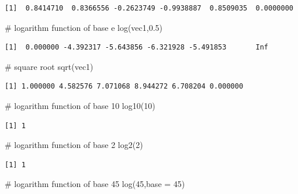 \documentclass[
  letterpaper,
  DIV=11,
  numbers=noendperiod]{scrreprt}
\newenvironment{Shaded}{\begin{snugshade}}{\end{snugshade}}
\newcommand{\AttributeTok}[1]{\textcolor[rgb]{0.40,0.45,0.13}{#1}}
\newcommand{\CommentTok}[1]{\textcolor[rgb]{0.37,0.37,0.37}{#1}}
\newcommand{\DecValTok}[1]{\textcolor[rgb]{0.68,0.00,0.00}{#1}}
\newcommand{\FloatTok}[1]{\textcolor[rgb]{0.68,0.00,0.00}{#1}}
\newcommand{\FunctionTok}[1]{\textcolor[rgb]{0.28,0.35,0.67}{#1}}
\newcommand{\NormalTok}[1]{\textcolor[rgb]{0.00,0.23,0.31}{#1}}
\begin{document}
\begin{verbatim}
[1]  0.8414710  0.8366556 -0.2623749 -0.9938887  0.8509035  0.0000000
\end{verbatim}

\begin{Shaded}
\begin{Highlighting}[]
\CommentTok{\# logarithm function of base e}
\FunctionTok{log}\NormalTok{(vec1,}\FloatTok{0.5}\NormalTok{)}
\end{Highlighting}
\end{Shaded}

\begin{verbatim}
[1]  0.000000 -4.392317 -5.643856 -6.321928 -5.491853       Inf
\end{verbatim}

\begin{Shaded}
\begin{Highlighting}[]
\CommentTok{\# square root}
\FunctionTok{sqrt}\NormalTok{(vec1)}
\end{Highlighting}
\end{Shaded}

\begin{verbatim}
[1] 1.000000 4.582576 7.071068 8.944272 6.708204 0.000000
\end{verbatim}

\begin{Shaded}
\begin{Highlighting}[]
\CommentTok{\# logarithm function of base 10}
\FunctionTok{log10}\NormalTok{(}\DecValTok{10}\NormalTok{)}
\end{Highlighting}
\end{Shaded}

\begin{verbatim}
[1] 1
\end{verbatim}

\begin{Shaded}
\begin{Highlighting}[]
\CommentTok{\# logarithm function of base 2}
\FunctionTok{log2}\NormalTok{(}\DecValTok{2}\NormalTok{)}
\end{Highlighting}
\end{Shaded}

\begin{verbatim}
[1] 1
\end{verbatim}

\begin{Shaded}
\begin{Highlighting}[]
\CommentTok{\# logarithm function of base 45}
\FunctionTok{log}\NormalTok{(}\DecValTok{45}\NormalTok{,}\AttributeTok{base =} \DecValTok{45}\NormalTok{)}
\end{Highlighting}
\end{Shaded}
\end{document}
